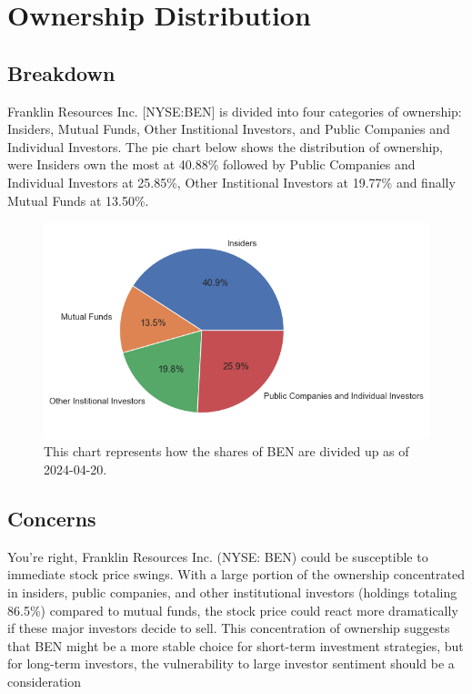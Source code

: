\documentclass[9pt,a4paper,twoside]{tau}
\begin{document}
\section{Ownership Distribution}
    \subsection{Breakdown}
        Franklin Resources Inc. [NYSE:BEN] is divided into four categories of ownership: Insiders, Mutual Funds, Other Institional Investors, and Public Companies and Individual Investors. The pie chart below shows the distribution of ownership, were Insiders own the most at 40.88\% followed by Public Companies and Individual Investors at 25.85\%, Other Institional Investors at 19.77\% and finally Mutual Funds at 13.50\%.

            \begin{figure}[H]
                \centering
                \includegraphics[width=0.85\columnwidth]{images/OwnershipPieChart.png}
                \caption{This chart represents how the shares of BEN are divided up as of 2024-04-20.}
                \label{fig:figure}
            \end{figure}

    \subsection{Concerns}
    
        You're right, Franklin Resources Inc. (NYSE: BEN) could be susceptible to immediate stock price swings. With a large portion of the ownership concentrated in insiders, public companies, and other institutional investors (holdings totaling 86.5\%) compared to mutual funds, the stock price could react more dramatically if these major investors decide to sell.  This concentration of ownership suggests that BEN might be a more stable choice for short-term investment strategies, but for long-term investors, the vulnerability to large investor sentiment should be a consideration
\end{document}
